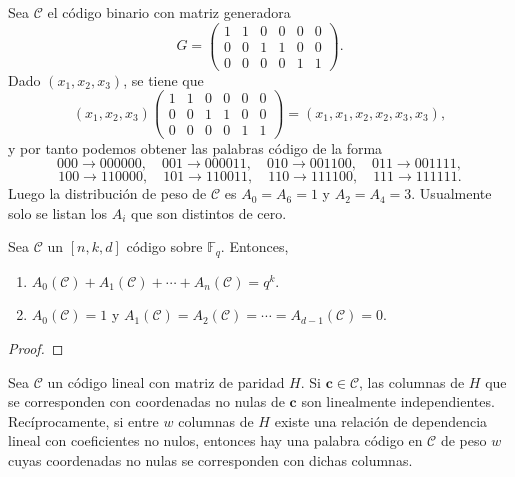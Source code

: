 \begin{example}
  Sea \(\mathcal C\) el código binario con matriz generadora
  \[
    G = \begin{pmatrix}
      1 & 1 & 0 & 0 & 0 & 0\\
      0 & 0 & 1 & 1 & 0 & 0 \\
      0 & 0 & 0 & 0 & 1 & 1
    \end{pmatrix}.
  \]
  Dado \((x_1, x_2, x_3)\), se tiene que \[(x_1, x_2, x_3) \begin{pmatrix}
    1 & 1 & 0 & 0 & 0 & 0\\
      0 & 0 & 1 & 1 & 0 & 0 \\
      0 & 0 & 0 & 0 & 1 & 1
  \end{pmatrix} = (x_1, x_1, x_2, x_2, x_3, x_3),\] y por tanto podemos obtener las palabras código de la forma 
  \[
    000 \to 000000, \quad 
    001 \to 000011,\quad 
    010 \to 001100,\quad 
    011 \to 001111,
  \]
  \[
    100 \to 110000, \quad 
    101 \to 110011,\quad 
    110 \to 111100,\quad 
    111 \to 111111.
  \]
  Luego la distribución de peso de \(\mathcal C\) es \(A_0 = A_6 = 1\) y \(A_2 = A_4 = 3\).
  Usualmente solo se listan los \(A_i\) que son distintos de cero.
\end{example}

\begin{theorem}
  Sea \(\mathcal C\) un \([n,k,d]\) código sobre \(\mathbb F_q\).
  Entonces, \begin{enumerate}
    \item \(A_0(\mathcal C) + A_1(\mathcal C) + \cdots + A_n(\mathcal C) = q^k\).
    \item \(A_0(\mathcal C) = 1\) y \(A_1(\mathcal C) = A_2(\mathcal C) = \cdots = A_{d-1}(\mathcal C) = 0\).
  \end{enumerate}
\end{theorem}

\begin{proof}
  
\end{proof}


\begin{theorem}
  Sea \(\mathcal C\) un código lineal con matriz de paridad \(H\). Si \(\symbf{c} \in \mathcal C\), las columnas de \(H\) que se corresponden con coordenadas no nulas de \(\symbf{c}\) son linealmente independientes.
  Recíprocamente, si entre \(w\) columnas de \(H\) existe una relación de dependencia lineal con coeficientes no nulos, entonces hay una palabra código en \(\mathcal C\) de peso \(w\) cuyas coordenadas no nulas se corresponden con dichas columnas.
\end{theorem}

